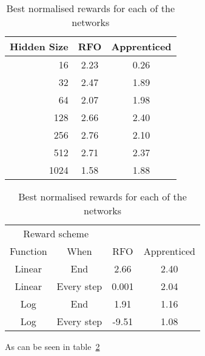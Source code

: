 \begin{table}[hbtp]
\centering
\begin{tabular}{r | cc}
Hidden Size & RFO & Apprenticed \\
\hline
16 & 2.23 & 0.26 \\
32 & 2.47 & 1.89 \\
64 & 2.07 & 1.98\\
128 & 2.66 & 2.40 \\
256 & 2.76 & 2.10 \\
512 & 2.71 & 2.37 \\
1024 & 1.58 & 1.88 \\

\end{tabular}
\begin{tabular}{c c | cc}
\multicolumn{2}{c}{Reward scheme}  & & \\
Function & When  & RFO & Apprenticed \\
\hline
Linear & End & 2.66 & 2.40 \\
Linear & Every step & 0.001 & 2.04 \\
Log & End & 1.91 & 1.16\\
Log & Every step & -9.51 & 1.08 \\

\end{tabular}


%


\caption{Best normalised rewards for each of the networks}
\label{tab:compare}

\end{table}

As can be seen in table~\ref{tab:compare}

